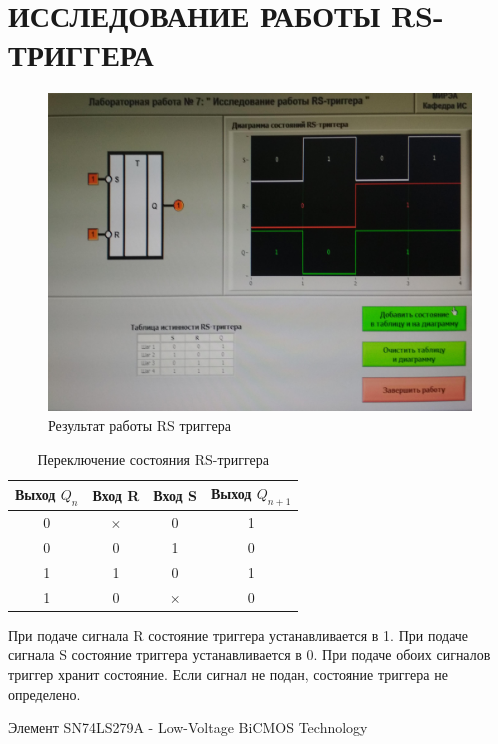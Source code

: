 \section{ИССЛЕДОВАНИЕ РАБОТЫ RS-ТРИГГЕРА}

\begin{figure}[H]
	\centering
	\includegraphics[width=0.95\linewidth]{imgs/7/1}
	\caption{Результат работы RS триггера}
	\label{fig:7_}
\end{figure}

\begin{table}[H]
	\centering
	\caption{Переключение состояния RS-триггера}
	\label{tab:lab_07}
	\begin{tabular}{|c|c|c|c|}
		\hline
		Выход $Q_n$ & Вход R   & Вход S   & Выход $Q_{n+1}$ \\ \hline
		0           & $\times$ & 0        & 1               \\ \hline
		0           & 0        & 1        & 0               \\ \hline
		1           & 1        & 0        & 1               \\ \hline
		1           & 0        & $\times$ & 0               \\ \hline
	\end{tabular}
\end{table}

При подаче сигнала R состояние триггера устанавливается в 1.
При подаче сигнала S состояние триггера устанавливается в 0.
При подаче обоих сигналов триггер хранит состояние.
Если сигнал не подан, состояние триггера не определено.

Элемент SN74LS279A - Low-Voltage BiCMOS Technology

